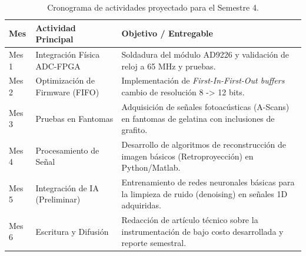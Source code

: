 \documentclass[12pt,letterpaper]{article}
\begin{document}
\begin{table}[H]
    \centering
    \begin{tabular}{|p{}|p{}|p{}|}
    \hline
    \textbf{Mes} & \textbf{Actividad Principal} & \textbf{Objetivo / Entregable} \\ \hline
    Mes 1 & Integración Física ADC-FPGA & Soldadura del módulo AD9226 y validación de reloj a 65 MHz y pruebas. \\ \hline
    Mes 2 & Optimización de Firmware (FIFO) & Implementación de \textit{First-In-First-Out buffers} cambio de resolución 8 -> 12 bits. \\ \hline
    Mes 3 & Pruebas en Fantomas & Adquisición de señales fotoacústicas (A-Scans) en fantomas de gelatina con inclusiones de grafito. \\ \hline
    Mes 4 & Procesamiento de Señal & Desarrollo de algoritmos de reconstrucción de imagen básicos (Retroproyección) en Python/Matlab. \\ \hline
    Mes 5 & Integración de IA (Preliminar) & Entrenamiento de redes neuronales básicas para la limpieza de ruido (denoising) en señales 1D adquiridas. \\ \hline
    Mes 6 & Escritura y Difusión & Redacción de artículo técnico sobre la instrumentación de bajo costo desarrollada y reporte semestral. \\ \hline
    \end{tabular}
    \caption{Cronograma de actividades proyectado para el Semestre 4.}
    \label{tab:cronograma}
\end{table}

\printbibliography
\end{document}
